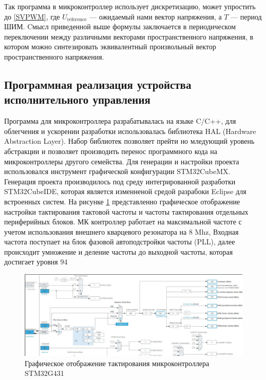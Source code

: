 Так программа в микроконтроллер использует дискретизацию, может упростить до \ref{SVPWM}, где $U_{\text{reference}}$ — ожидаемый нами вектор напряжения, а $T$ — период ШИМ. Cмысл приведенной выше формулы заключается в периодическом переключении между различными векторами пространственного напряжения, в котором можно синтезировать эквивалентный произвольный вектор пространственного напряжения.



\subsection{Программная реализация устройства исполнительного управления}

Программа для микроконтроллера разрабатывалась на языке C/C++, для облегчения и ускорении разработки использовалась библиотека HAL (Hardware Abstraction Layer). Набор библиотек позволяет прейти но мледующий уровень абстракции и позволяет производить перенос программного кода на микроконтроллеры другого семейства. Для генерации и настройки проекта использовался инструмент графической конфигурации STM32CubeMX. Генерация проекта производилось под среду интегрированной разработки STM32CubeIDE, которая является изменненой средой разрабоки Eclipse для встроенных систем. На рисунке \ref{STM32G431MX} представленно графическое отображение настройки тактирования тактовой частоты и частоты тактирования отдельных периферийных блоков. МК контроллер работает на максимальной частоте с учетом использования внешнего кварцевого резонатора на 8 Mhz, Входная частота поступает на блок фазовой автоподстройки частоты (PLL), далее происходит умножение и деление частоты до выходной частоты, которая достигает уровня 94%


\begin{figure}[H]
	\centering
	\includegraphics[width=\textwidth]{Src/images/CubeMX.png}
	\caption{Графическое отображение тактирования микроконтроллера STM32G431}
	\label{STM32G431MX}
\end{figure}


